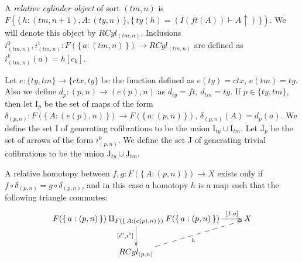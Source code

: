 \documentclass[reqno]{amsart}
\theoremstyle{definition}
\theoremstyle{remark}
\newcommand{\I}{\mathrm{I}}
\newcommand{\J}{\mathrm{J}}
\numberwithin{figure}{section}
\begin{document}
A \emph{relative cylinder object} of sort $(tm,n)$ is $F(\{\,h : (tm,n+1), A : (ty,n)\,\}, \{\,ty(h) \allowbreak = (I(ft(A)) \vdash A\!\!\uparrow)\,\})$.
We will denote this object by $RCyl_{(tm,n)}$.
Inclusions $i^0_{(tm,n)}, i^1_{(tm,n)} : F(\{\,a : (tm,n)\,\}) \to RCyl_{(tm,n)}$ are defined as $i^k_{(tm,n)}(a) = h[c_k]$.

Let $e : \{ ty, tm \} \to \{ ctx, ty \}$ be the function defined as $e(ty) = ctx$, $e(tm) = ty$.
Also we define $d_p : (p,n) \to (e(p),n)$ as $d_{ty} = ft$, $d_{tm} = ty$.
If $p \in \{ ty, tm \}$, then let $\I_p$ be the set of maps of the form $\delta_{(p,n)} : F(\{\,A : (e(p),n)\,\}) \to F(\{\,a : (p,n)\,\})$, $\delta_{(p,n)}(A) = d_p(a)$.
We define the set $\I$ of generating cofibrations to be the union $\I_{ty} \cup \I_{tm}$.
Let $\J_p$ be the set of arrows of the form $i^0_{(p,n)}$.
We define the set $\J$ of generating trivial cofibrations to be the union $\J_{ty} \cup \J_{tm}$.

\begin{remark}
A relative homotopy between $f,g : F(\{\,A : (p,n)\,\}) \to X$ exists only if $f \circ \delta_{(p,n)} = g \circ \delta_{(p,n)}$, and in this case a homotopy $h$ is a map such that the following triangle commutes:
\[ \xymatrix{ F(\{\,a : (p,n)\,\}) \amalg_{F(\{\,A : (e(p),n)\,\})} F(\{\,a : (p,n)\,\}) \ar[d]_{[i^0,i^1]} \ar[r]^-{[f,g]} & X \\
              RCyl_{(p,n)} \ar@{-->}[ur]_h
            } \]
\end{remark}
\end{document}
